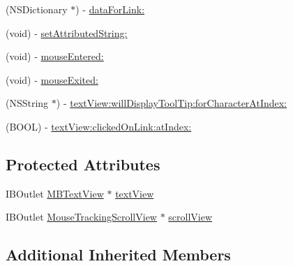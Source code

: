 \begin{DoxyCompactItemize}
\item 
(N\-S\-Dictionary $\ast$) -\/ \hyperlink{interface_ext_text_view_controller_a2ae591a3effa0d9455b8149647d65852}{data\-For\-Link\-:}
\item 
(void) -\/ \hyperlink{interface_ext_text_view_controller_ac6a23f2001dbb833ecf793fbf9a07301}{set\-Attributed\-String\-:}
\item 
(void) -\/ \hyperlink{interface_ext_text_view_controller_a13a1d8a374c5a945bfa34dd3058ef6ab}{mouse\-Entered\-:}
\item 
(void) -\/ \hyperlink{interface_ext_text_view_controller_ac229af7b37d54405d9564790876bb02d}{mouse\-Exited\-:}
\item 
(N\-S\-String $\ast$) -\/ \hyperlink{interface_ext_text_view_controller_aa329cd1f67204aa716529d71aca65af5}{text\-View\-:will\-Display\-Tool\-Tip\-:for\-Character\-At\-Index\-:}
\item 
(B\-O\-O\-L) -\/ \hyperlink{interface_ext_text_view_controller_a8c695e12b6b541a2db6649c31f02d89a}{text\-View\-:clicked\-On\-Link\-:at\-Index\-:}
\end{DoxyCompactItemize}
\subsection*{Protected Attributes}
\begin{DoxyCompactItemize}
\item 
I\-B\-Outlet \hyperlink{interface_m_b_text_view}{M\-B\-Text\-View} $\ast$ \hyperlink{interface_ext_text_view_controller_abfa30436fff57bf39e679f9046d4b9bd}{text\-View}
\item 
I\-B\-Outlet \hyperlink{interface_mouse_tracking_scroll_view}{Mouse\-Tracking\-Scroll\-View} $\ast$ \hyperlink{interface_ext_text_view_controller_a85923391d7476cb50037cb7e79eb71de}{scroll\-View}
\end{DoxyCompactItemize}
\subsection*{Additional Inherited Members}


